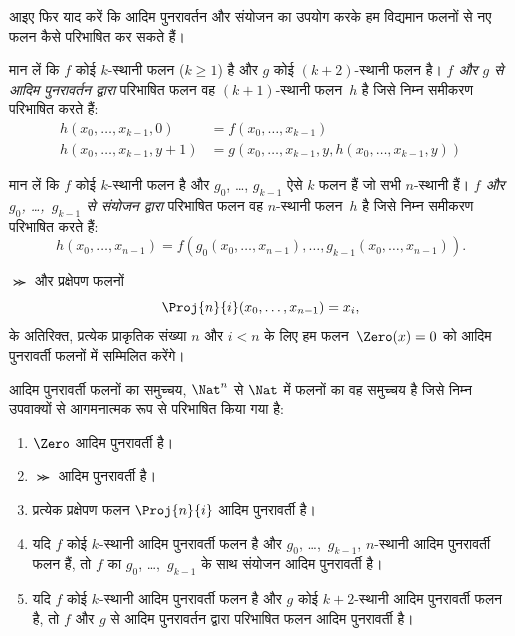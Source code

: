 \documentclass[../../../include/open-logic-section]{subfiles}
\begin{document}

आइए फिर याद करें कि आदिम पुनरावर्तन और संयोजन का उपयोग करके हम विद्यमान
फलनों से नए फलन कैसे परिभाषित कर सकते हैं।

\begin{defn}
   मान लें कि $f$ कोई $k$-स्थानी
  फलन ($k\ge 1$) है और $g$ कोई $(k+2)$-स्थानी फलन है। \emph{$f$ और
  $g$ से आदिम पुनरावर्तन द्वारा} परिभाषित फलन वह $(k+1)$-स्थानी
  फलन~$h$ है जिसे निम्न समीकरण परिभाषित करते हैं:
  \begin{align*}
    h(x_0,\dots,x_{k-1},0) & =  f(x_0,\dots,x_{k-1}) \\
    h(x_0,\dots,x_{k-1},y+1) & = g(x_0,\dots,x_{k-1}, y, h(x_0,\dots,x_{k-1}, y))
  \end{align*}
\end{defn}

\begin{defn}
   मान लें कि $f$ कोई $k$-स्थानी फलन है और
  $g_0$, \dots, $g_{k-1}$ ऐसे $k$ फलन हैं जो सभी $n$-स्थानी हैं।
  \emph{$f$ और $g_0$, \dots,~$g_{k-1}$ से संयोजन द्वारा} परिभाषित
  फलन वह $n$-स्थानी फलन~$h$ है जिसे निम्न समीकरण परिभाषित करते हैं:
  \[
  h(x_0, \dots, x_{n-1}) =
  f(g_0(x_0, \dots, x_{n-1}), \dots, g_{k-1}(x_0, \dots, x_{n-1})).
  \]
\end{defn}

$\Succ$ और प्रक्षेपण फलनों
\[
\Proj{n}{i}(x_0,\dots,x_{n-1}) = x_i,
\]
के अतिरिक्त, प्रत्येक प्राकृतिक संख्या $n$ और $i < n$ के लिए हम
फलन~$\Zero(x) = 0$ को आदिम पुनरावर्ती फलनों में सम्मिलित करेंगे।

\begin{defn}
  आदिम पुनरावर्ती फलनों का समुच्चय, $\Nat^n$ से $\Nat$ में फलनों का वह
  समुच्चय है जिसे निम्न उपवाक्यों से आगमनात्मक रूप से परिभाषित किया गया है:
  \begin{enumerate}
  \item $\Zero$ आदिम पुनरावर्ती है।
  \item $\Succ$ आदिम पुनरावर्ती है।
  \item प्रत्येक प्रक्षेपण फलन $\Proj{n}{i}$ आदिम पुनरावर्ती है।
  \item यदि $f$ कोई $k$-स्थानी आदिम पुनरावर्ती फलन है और $g_0$,
    \dots,~$g_{k-1}$, $n$-स्थानी आदिम पुनरावर्ती फलन हैं, तो $f$ का
    $g_0$, \dots,~$g_{k-1}$ के साथ संयोजन आदिम पुनरावर्ती है।
  \item यदि $f$ कोई $k$-स्थानी आदिम पुनरावर्ती फलन है और $g$ कोई
    $k+2$-स्थानी आदिम पुनरावर्ती फलन है, तो $f$ और $g$ से आदिम
    पुनरावर्तन द्वारा परिभाषित फलन आदिम पुनरावर्ती है।
\end{enumerate}
\end{defn}
\end{document}
